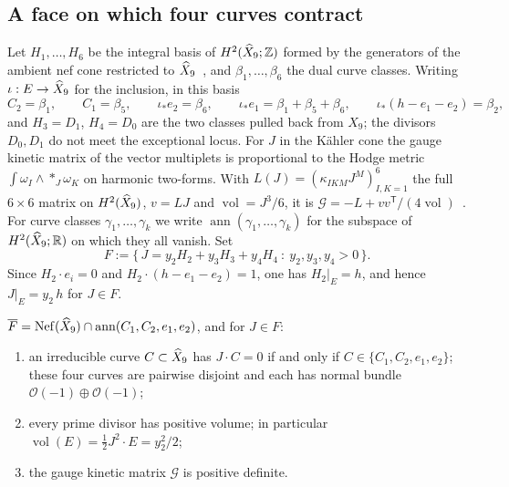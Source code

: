 \subsection{A face on which four curves contract}
\label{subsec:face}

Let $H_1,\dots,H_6$ be the integral basis of $H^2(\widehat X_9;\mathbb Z)$ formed by the
generators of the ambient nef cone restricted to $\widehat X_9$~\cite[eq.~(C.1)]{W26quantum},
and $\beta_1,\dots,\beta_6$ the dual curve classes. Writing $\iota:E\to\widehat X_9$ for the inclusion, in
this basis
\begin{equation}
 C_2=\beta_1,\qquad C_1=\beta_5,\qquad \iota_*e_2=\beta_6,\qquad
 \iota_*e_1=\beta_1+\beta_5+\beta_6,\qquad \iota_*(h-e_1-e_2)=\beta_2,
 \label{eq:face-charges}
\end{equation}
and $H_3=D_1$, $H_4=D_0$ are the two classes pulled back from $X_9$; the divisors $D_0,D_1$
do not meet the exceptional locus. For $J$ in the K\"ahler cone the gauge kinetic matrix of the
vector multiplets is proportional to the Hodge metric $\int\omega_I\wedge*_J\omega_K$ on harmonic
two-forms. With $L(J)=(\kappa_{IKM}J^M)_{I,K=1}^{6}$ the full $6\times6$ matrix on
$H^2(\widehat X_9)$, $v=LJ$ and $\operatorname{vol}=J^3/6$, it is
$\mathcal G=-L+vv^{\mathsf T}/(4\operatorname{vol})$~\cite[eqs.~(4.1), (4.6)]{W26quantum}. For curve classes $\gamma_1,\dots,\gamma_k$ we write $\operatorname{ann}(\gamma_1,\dots,\gamma_k)$
for the subspace of $H^2(\widehat X_9;\mathbb R)$ on which they all vanish. Set
\begin{equation}
 F:=\{\,J=y_2H_2+y_3H_3+y_4H_4\ :\ y_2,y_3,y_4>0\,\}.
 \label{eq:face-def}
\end{equation}
Since $H_2\cdot e_i=0$ and $H_2\cdot(h-e_1-e_2)=1$, one has $H_2|_E=h$, and hence
$J|_E=y_2\,h$ for $J\in F$.

\begin{proposition}\label{prop:face}
$\overline F=\operatorname{Nef}(\widehat X_9)\cap\operatorname{ann}(C_1,C_2,e_1,e_2)$, and
for $J\in F$:
\begin{enumerate}
\item an irreducible curve $C\subset\widehat X_9$ has $J\cdot C=0$ if and only if
 $C\in\{C_1,C_2,e_1,e_2\}$; these four curves are pairwise disjoint and each has normal
 bundle $\mathcal O(-1)\oplus\mathcal O(-1)$;
\item every prime divisor has positive volume; in particular
 $\operatorname{vol}(E)=\tfrac12J^2\cdot E=y_2^2/2$;
\item the gauge kinetic matrix $\mathcal G$ is positive definite.
\end{enumerate}
\end{proposition}

